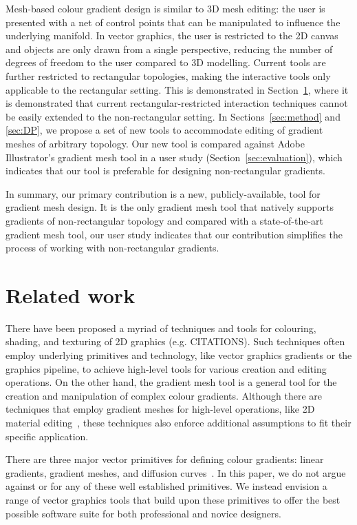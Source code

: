 \documentclass{egpubl}
\begin{document}
Mesh-based colour gradient design is similar to 3D mesh editing: the user is presented with a net of control points that can be manipulated to influence the underlying manifold. In vector graphics, the user is restricted to the 2D canvas and objects are only drawn from a single perspective, reducing the number of degrees of freedom to the user compared to 3D modelling. Current tools are further restricted to rectangular topologies, making the interactive tools only applicable to the rectangular setting. This is demonstrated in Section~\ref{sec:RW}, where it is demonstrated that current rectangular-restricted interaction techniques cannot be easily extended to the non-rectangular setting. In Sections~\ref{sec:method} and \ref{sec:DP}, we propose a set of new tools to accommodate editing of gradient meshes of arbitrary topology. Our new tool is compared against Adobe Illustrator's gradient mesh tool in a user study (Section~\ref{sec:evaluation}), which indicates that our tool is preferable for designing non-rectangular gradients.

In summary, our primary contribution is a new, publicly-available, tool for gradient mesh design. It is the only gradient mesh tool that natively supports gradients of non-rectangular topology and compared with a state-of-the-art gradient mesh tool, our user study indicates that our contribution simplifies the process of working with non-rectangular gradients.

\section{Related work}
\label{sec:RW}

There have been proposed a myriad of techniques and tools for colouring, shading, and texturing of 2D graphics (e.g. CITATIONS). Such techniques often employ underlying primitives and technology, like vector graphics gradients or the graphics pipeline, to achieve high-level tools for various creation and editing operations. On the other hand, the gradient mesh tool is a general tool for the creation and manipulation of complex colour gradients. Although there are techniques that employ gradient meshes for high-level operations, like 2D material editing~\cite{Lopez-Moreno:2013}, these techniques also enforce additional assumptions to fit their specific application.

There are three major vector primitives for defining colour gradients: linear gradients, gradient meshes, and diffusion curves~\cite{Orzan:2008}. In this paper, we do not argue against or for any of these well established primitives. We instead envision a range of vector graphics tools that build upon these primitives to offer the best possible software suite for both professional and novice designers.
\end{document}
